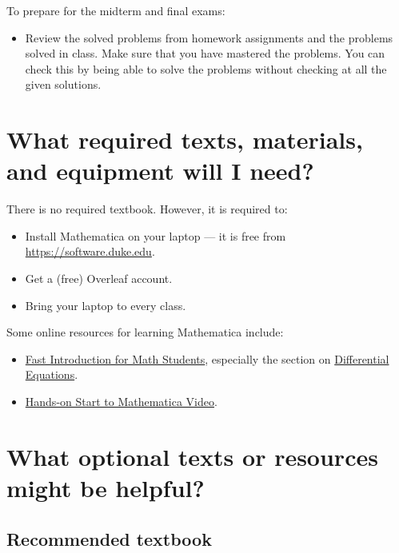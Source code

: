 \documentclass[11pt]{article}
\begin{document}
To prepare for the midterm and final exams:
\begin{itemize}[label={-},noitemsep]
\item Review the solved problems from homework assignments and the problems solved in class. Make sure that you have mastered the problems. You can check this by being able to solve the problems without checking at all the given solutions.
\end{itemize}


\section{What required texts, materials, and equipment will I need?}

There is no required textbook. However, it is required to:
\begin{itemize}[label={-},noitemsep]
\item Install Mathematica on your laptop — it is free from \url{https://software.duke.edu}.
\item Get a (free) Overleaf account.
\item Bring your laptop to every class.
\end{itemize}

Some online resources for learning Mathematica include:
\begin{itemize}[label={-},noitemsep]
\item \href{https://www.wolfram.com/language/fast-introduction-for-math-students/en/}{Fast Introduction for Math Students}, especially the section on \href{https://www.wolfram.com/language/fast-introduction-for-math-students/en/differential-equations/}{Differential Equations}.
\item \href{https://www.wolfram.com/wolfram-u/catalog/gen005/}{Hands-on Start to Mathematica Video}.
\end{itemize}



\section{What optional texts or resources might be helpful?}

\subsection{Recommended textbook}
\end{document}
